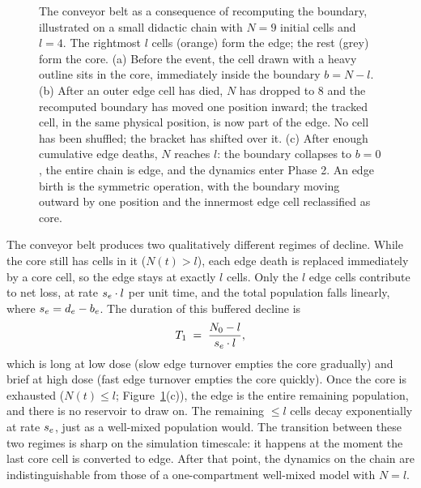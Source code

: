 \begin{figure}[h!]
\caption{The conveyor belt as a consequence of recomputing the boundary, illustrated on a small didactic chain with $N = 9$ initial cells and $l = 4$. The rightmost $l$ cells (orange) form the edge; the rest (grey) form the core. (a) Before the event, the cell drawn with a heavy outline sits in the core, immediately inside the boundary $b = N - l$. (b) After an outer edge cell has died, $N$ has dropped to $8$ and the recomputed boundary has moved one position inward; the tracked cell, in the same physical position, is now part of the edge. No cell has been shuffled; the bracket has shifted over it. (c) After enough cumulative edge deaths, $N$ reaches $l$: the boundary collapses to $b = 0$, the entire chain is edge, and the dynamics enter Phase 2. An edge birth is the symmetric operation, with the boundary moving outward by one position and the innermost edge cell reclassified as core.}
\label{fig:conveyor}
\end{figure}

The conveyor belt produces two qualitatively different regimes of decline. While the core still has cells in it ($N(t) > l$), each edge death is replaced immediately by a core cell, so the edge stays at exactly $l$ cells. Only the $l$ edge cells contribute to net loss, at rate $s_e \cdot l$ per unit time, and the total population falls linearly, where $s_e = d_e - b_e$. The duration of this buffered decline is
\begin{equation}
T_1 \;=\; \frac{N_0 - l}{s_e \cdot l},
\label{eq:T1}
\end{equation}
which is long at low dose (slow edge turnover empties the core gradually) and brief at high dose (fast edge turnover empties the core quickly). Once the core is exhausted ($N(t) \le l$; Figure~\ref{fig:conveyor}(c)), the edge is the entire remaining population, and there is no reservoir to draw on. The remaining $\le l$ cells decay exponentially at rate $s_e$, just as a well-mixed population would. The transition between these two regimes is sharp on the simulation timescale: it happens at the moment the last core cell is converted to edge. After that point, the dynamics on the chain are indistinguishable from those of a one-compartment well-mixed model with $N = l$.

